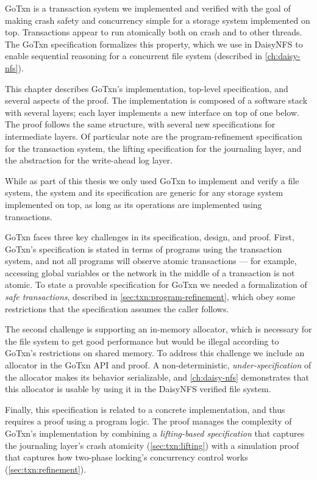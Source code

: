 GoTxn is a transaction system we implemented and verified with the goal of
making crash safety and concurrency simple for a storage system implemented on
top. Transactions appear to run atomically both on crash and to other threads.
The GoTxn specification formalizes this property, which we use in DaisyNFS to
enable sequential reasoning for a concurrent file system (described in
\cref{ch:daisy-nfs}).

This chapter describes GoTxn's implementation, top-level specification, and
several aspects of the proof. The implementation is composed of a software stack
with several layers; each layer implements a new interface on top of one
below. The proof follows the same structure, with several new specifications for
intermediate layers. Of particular note are the
program-refinement specification for the transaction system, the lifting
specification for the journaling layer, and the abstraction for the write-ahead
log layer.

While as part of this thesis we only used GoTxn to implement and verify a file
system, the system and its specification are generic for any
storage system implemented on top, as long as its operations are implemented
using transactions.

GoTxn faces three key challenges in its specification, design, and proof.
First, GoTxn's specification is stated in terms of programs using the
transaction system, and not all programs will observe atomic transactions ---
for example, accessing global variables or the network in the middle of a
transaction is not atomic. To state a provable specification for GoTxn we needed
a formalization of \emph{safe transactions}, described in \cref{sec:txn:program-refinement},
which obey some restrictions that the specification assumes the caller follows.

The second challenge is supporting an in-memory allocator, which is necessary
for the file system to get good performance but would be illegal according to
GoTxn's restrictions on shared memory. To address this challenge we include an
allocator in the GoTxn API and proof. A non-deterministic,
\emph{under-specification} of the allocator makes its behavior serializable, and
\cref{ch:daisy-nfs} demonstrates that this allocator is usable by using it in
the DaisyNFS verified file system.

Finally, this specification is related to a concrete implementation, and thus
requires a proof using a program logic. The proof manages the complexity of
GoTxn's implementation by combining a \emph{lifting-based specification} that
captures the journaling layer's crash atomicity (\cref{sec:txn:lifting}) with a
simulation proof that captures how two-phase locking's concurrency control works
(\cref{sec:txn:refinement}).








